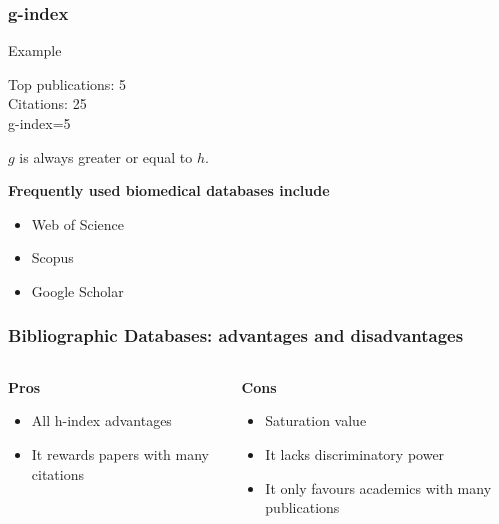 \documentclass{beamer}
\newcommand{\pros}{\item[{\textcolor[HTML]{3C8031}{\ding{51}}}]}
\newcommand{\cons}{\item[\textcolor{red}{\ding{54}}]}
\begin{document}
\begin{frame}
    \frametitle{g-index}
    \begin{exampleblock}{Example}
        \begin{center}
            Top publications: 5\\
            Citations:        25\\
            g-index=5
        \end{center}
    \end{exampleblock}

    \begin{alertblock}{}
        $g$ is always greater or equal to $h$.
    \end{alertblock}

    \textbf{Frequently used biomedical databases include}
    \begin{itemize}
        \item Web of Science
        \item Scopus
        \item Google Scholar
    \end{itemize}
\end{frame}
\begin{frame}
    \frametitle{Bibliographic Databases: advantages and disadvantages }
    \begin{columns}[T]
        \begin{column}{.5\textwidth}
            \centering \textbf{Pros}
            \begin{itemize}[<+->]
                \pros All h-index advantages
                \pros It rewards papers with many citations
            \end{itemize}
        \end{column}
        \begin{column}{.5\textwidth}
            \centering \textbf{Cons}
            \begin{itemize}[<+->]
                \cons Saturation value
                \cons It lacks discriminatory power
                \cons It only favours academics with many publications
            \end{itemize}
        \end{column}
    \end{columns}
\end{frame}
\end{document}
